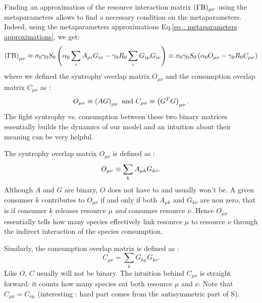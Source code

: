 \documentclass[12pt, titlepage]{report}
\begin{document}
\noindent Finding an approximation of the resource interaction matrix $(\Gamma\text{B})_{\mu \nu}$ using the metaparameters allows to find a necessary condition on the metaparameters. Indeed, using the metaparameters approximations Eq.\eqref{eq : metaparameters approximations}, we get:
\begin{equation}\label{eq : metaparam approximation GammaBeta}
\left(\Gamma \text{B}\right)_{\mu \nu}\approx \sigma_0 \gamma_0 S_0 \left(\alpha_0 \sum_i A_{\mu i}G_{i\nu}-\gamma_0 R_0 \sum_i G_{i\mu}G_{i\nu}\right)\equiv \sigma_0 \gamma_0 S_0 \left(\alpha_0 O_{\mu \nu}-\gamma_0R_0 C_{\mu\nu}\right)
\end{equation}
where we defined the syntrophy overlap matrix $O_{\mu\nu}$ and the consumption overlap matrix $C_{\mu\nu}$ as :
\begin{equation}
O_{\mu\nu} \equiv \left(AG\right)_{\mu \nu} \text{ and } C_{\mu\nu} \equiv \left(G^TG\right)_{\mu\nu}.
\end{equation}
The fight syntrophy vs. consumption between these two binary matrices essentially builds the dynamics of our model and an intuition about their meaning can be very helpful.

The syntrophy overlap matrix $O_{\mu\nu}$ is defined as :
\begin{equation}
O_{\mu\nu} \equiv \sum_k A_{\mu k} G_{k\nu}.
\end{equation}
Although $A$ and $G$ are binary, $O$ does not have to and usually won't be. A given consumer $k$ contributes to $O_{\mu\nu}$ if and only if both $A_{\mu k}$ and $G_{k\nu}$ are non zero, that is if consumer $k$ releases resource $\mu$ \textit{and} consumes resource $\nu$. Hence $O_{\mu\nu}$ essentially tells how many species effectively link resource $\mu$ to resource $\nu$ through the indirect interaction of the species consumption.

\noindent Similarly, the consumption overlap matrix is defined as :
\begin{equation}
C_{\mu\nu}=\sum_k G_{k \mu}G_{k \nu}.
\end{equation}
Like $O$, $C$ usually will not be binary. The intuition behind $C_{\mu\nu}$ is straight forward: it counts how many species eat both resource $\mu$ and $\nu$. Note that $C_{\mu\nu}=C_{\nu\mu}$ (interesting : hard part comes from the antisymmetric part of S).
\end{document}
